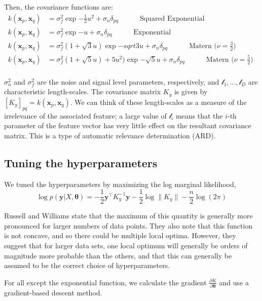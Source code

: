 \documentclass{article} %
\def\bfx{\mathbf x}
\def\bfy{\mathbf y}
\def\bftheta{\mathbf \theta}
\def\l{\mathcal l}
\begin{document}
Then, the covariance functions are:
\begin{align}
	k(\bfx_p, \bfx_q) &= \sigma_f^2 \exp{- \frac{1}{2} u^2} + \sigma_n \delta_{pq} \quad \quad \quad \mbox{Squared Exponential}   \\
	k(\bfx_p, \bfx_q) &= \sigma_f^2 \exp{- u} + \sigma_n \delta_{pq} \quad \quad \quad \mbox{Exponential}   \\
	k(\bfx_p, \bfx_q) &= \sigma_f^2 \left( 1 + \sqrt{3} u \right) \exp{- sqrt{3}  u} + \sigma_n \delta_{pq} \quad \quad \quad \mbox{Matern ($\nu = \frac{3}{2}$) }   \\
	k(\bfx_p, \bfx_q) &= \sigma_f^2 \left( 1 + \sqrt{5} u \right) + 5 u^2) \exp{- \sqrt{5} u} + \sigma_n \delta_{pq} \quad \quad \quad \mbox{Matern ($\nu = \frac{5}{2}$) }   \\
\end{align}

$\sigma_n^2$ and $\sigma_f^2$ are the noise and signal level parameters, respectively, and $\l_1, \dots, \l_D$ are characteristic length-scales.
The covariance matrix $K_y$ is given by $[K_y]_{pq} = k(\bfx_p, \bfx_q)$.
We can think of these length-scales as a measure of the irrelevance of the associated feature; a large value of $\l_i$ means that the $i$-th parameter of the feature vector has very little effect on the resultant covariance matrix.
This is a type of automatic relevance determination (ARD).

\subsection{Tuning the hyperparameters}
We tuned the hyperparameters by maximizing the log marginal likelihood, 
\begin{equation}
	\log p(\bfy | X, \bftheta) = - \frac{1}{2} \bfy^\top K_y^{-1} \bfy - \frac{1}{2} \log \| K_y \| - \frac{n}{2} \log (2 \pi)
\end{equation}

Russell and Williams state that the maximum of this quantity is generally more pronounced for larger numbers of data points.
They also note that this function is not concave, and so there could be multiple local optima.
However, they suggest that for larger data sets, one local optimum will generally be orders of magnitude more probable than the others, and that this can generally be assumed to be the correct choice of hyperparameters.

For all except the exponential function, we calculate the gradient $\frac{\partial K} {\partial \bftheta}$ and use a gradient-based descent method.
\end{document}
